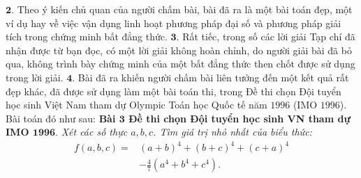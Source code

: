 \begin{multicols}{2}
	\vskip 0.05cm
	$\pmb{2.}$ Theo ý kiến chủ quan của người chấm bài, bài đã ra là một bài toán đẹp, một ví dụ hay về việc vận dụng linh hoạt phương pháp đại số và phương pháp giải tích trong chứng minh bất đẳng thức.
	\vskip 0.05cm
	$\pmb{3.}$ Rất tiếc, trong số các lời giải Tạp chí đã nhận được từ bạn đọc, có một lời giải không hoàn chỉnh, do người giải bài đã bỏ qua, không trình bày chứng minh của một bất đẳng thức then chốt được sử dụng trong lời giải.
	\vskip 0.05cm
	$\pmb{4.}$ Bài đã ra khiến người chấm bài liên tưởng đến một kết quả rất đẹp khác, đã được sử dụng làm một bài toán thi, trong Đề thi chọn Đội tuyển học sinh Việt Nam tham dự Olympic Toán học Quốc tế năm $1996$ (IMO $1996$). Bài toán đó như sau:
	\vskip 0.05cm
	\textbf{\color{thachthuctoanhoc}Bài $\pmb{3}$ Đề thi chọn Đội tuyển học sinh VN tham dự IMO $\pmb{1996.}$} \textit{Xét các số thực $a, b, c$. Tìm giá trị nhỏ nhất của biểu thức:}
	\begin{align*}
		f\left( {a,b,c} \right) =& {\left( {a + b} \right)^4} + {\left( {b + c} \right)^4} + {\left( {c + a} \right)^4} \\
		&- \frac{4}{7}\left( {{a^4} + {b^4} + {c^4}} \right).
	\end{align*}
	

\end{multicols}
